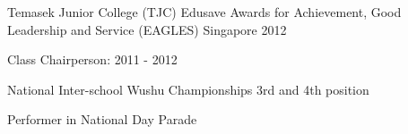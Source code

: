 
\begin{cventries}

  \cventry
    {Temasek Junior College (TJC)} %
    {Edusave Awards for Achievement, Good Leadership and Service (EAGLES)} %
    {Singapore} %
    {2012} %
    {
      \begin{cvitems} %
        \item {Class Chairperson: 2011 - 2012}
        \item {National Inter-school Wushu Championships 3rd and 4th position}
        \item {Performer in National Day Parade}
      \end{cvitems}
    }

\end{cventries}
